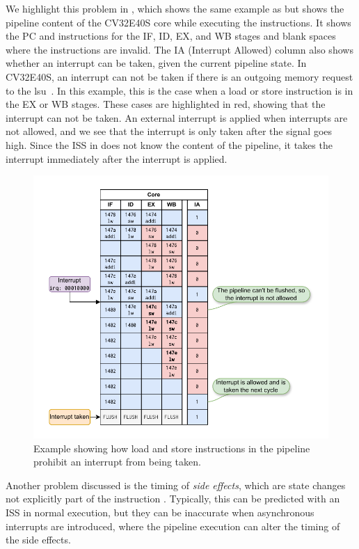 We highlight this problem in , which shows the same example as  but shows the pipeline content of the CV32E40S core while executing the instructions. It shows the PC and instructions for the IF, ID, EX, and WB stages and blank spaces where the instructions are invalid. The IA (Interrupt Allowed) column also shows whether an interrupt can be taken, given the current pipeline state. In CV32E40S, an interrupt can not be taken if there is an outgoing memory request to the \acrshort{lsu}~\cite{openhwgroupExceptionsInterruptsCOREV2023}. In this example, this is the case when a load or store instruction is in the EX or WB stages. These cases are highlighted in red, showing that the interrupt can not be taken. An external interrupt is applied when interrupts are not allowed, and we see that the interrupt is only taken after the  signal goes high. Since the ISS in  does not know the content of the pipeline, it takes the interrupt immediately after the interrupt is applied.

\begin{figure}
    \centering
    \includegraphics[width=1.00\linewidth]{figures/lw_sw_pipeline_example.pdf}
    \caption{Example showing how load and store instructions in the pipeline prohibit an interrupt from being taken.}
    \label{fig:lw_sw_pipeline}
\end{figure}


Another problem discussed is the timing of \textit{side effects}, which are state changes not explicitly part of the instruction \cite{taylorAdvancedRISCVVerification2023}. Typically, this can be predicted with an ISS in normal execution, but they can be inaccurate when asynchronous interrupts are introduced, where the pipeline execution can alter the timing of the side effects.









